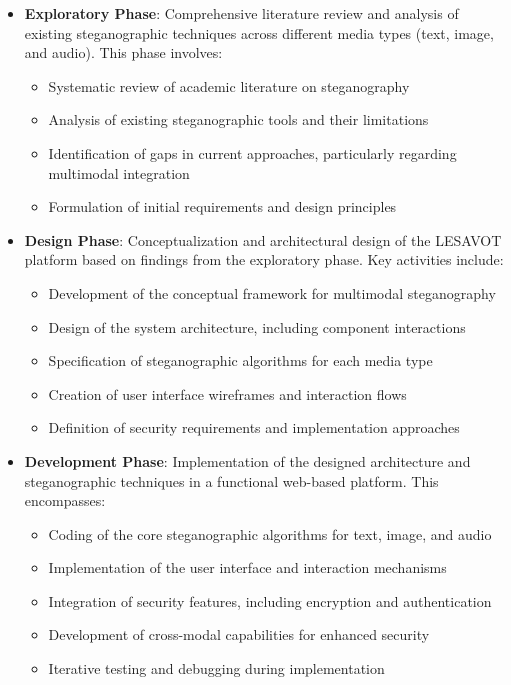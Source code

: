 \documentclass[12pt, a4paper, oneside]{book}
\begin{document}
\begin{itemize}[leftmargin=*]
    \item \textbf{Exploratory Phase}: Comprehensive literature review and analysis of existing steganographic techniques across different media types (text, image, and audio). This phase involves:
    \begin{itemize}
        \item Systematic review of academic literature on steganography
        \item Analysis of existing steganographic tools and their limitations
        \item Identification of gaps in current approaches, particularly regarding multimodal integration
        \item Formulation of initial requirements and design principles
    \end{itemize}

    \item \textbf{Design Phase}: Conceptualization and architectural design of the LESAVOT platform based on findings from the exploratory phase. Key activities include:
    \begin{itemize}
        \item Development of the conceptual framework for multimodal steganography
        \item Design of the system architecture, including component interactions
        \item Specification of steganographic algorithms for each media type
        \item Creation of user interface wireframes and interaction flows
        \item Definition of security requirements and implementation approaches
    \end{itemize}

    \item \textbf{Development Phase}: Implementation of the designed architecture and steganographic techniques in a functional web-based platform. This encompasses:
    \begin{itemize}
        \item Coding of the core steganographic algorithms for text, image, and audio
        \item Implementation of the user interface and interaction mechanisms
        \item Integration of security features, including encryption and authentication
        \item Development of cross-modal capabilities for enhanced security
        \item Iterative testing and debugging during implementation
    \end{itemize}


\end{itemize}
\end{document}
